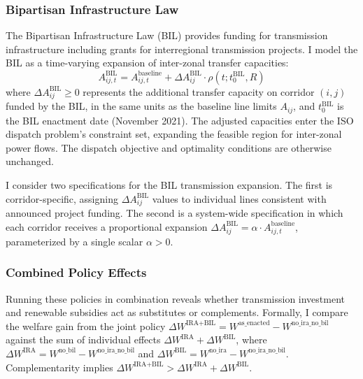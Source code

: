 \documentclass[12pt]{article}
\begin{document}

\subsubsection{Bipartisan Infrastructure Law}

The Bipartisan Infrastructure Law (BIL) provides funding for transmission infrastructure including grants for interregional transmission projects. I model the BIL as a time-varying expansion of inter-zonal transfer capacities:
\begin{equation}
    A_{ij,t}^{\text{BIL}} = A_{ij,t}^{\text{baseline}} + \Delta A^{\text{BIL}}_{ij} \cdot \rho(t; t_0^{\text{BIL}}, R)
\end{equation}
where $\Delta A^{\text{BIL}}_{ij} \geq 0$ represents the additional transfer capacity on corridor $(i,j)$ funded by the BIL, in the same units as the baseline line limits $A_{ij}$, and $t_0^{\text{BIL}}$ is the BIL enactment date (November 2021). The adjusted capacities enter the ISO dispatch problem's constraint set, expanding the feasible region for inter-zonal power flows. The dispatch objective and optimality conditions are otherwise unchanged.

I consider two specifications for the BIL transmission expansion. The first is corridor-specific, assigning $\Delta A^{\text{BIL}}_{ij}$ values to individual lines consistent with announced project funding. The second is a system-wide specification in which each corridor receives a proportional expansion $\Delta A^{\text{BIL}}_{ij} = \alpha \cdot A_{ij,t}^{\text{baseline}}$, parameterized by a single scalar $\alpha > 0$.


\subsubsection{Combined Policy Effects}

Running these policies in combination reveals whether transmission investment and renewable subsidies act as substitutes or complements. Formally, I compare the welfare gain from the joint policy $\Delta W^{\text{IRA+BIL}} = W^{\text{as\_enacted}} - W^{\text{no\_ira\_no\_bil}}$ against the sum of individual effects $\Delta W^{\text{IRA}} + \Delta W^{\text{BIL}}$, where $\Delta W^{\text{IRA}} = W^{\text{no\_bil}} - W^{\text{no\_ira\_no\_bil}}$ and $\Delta W^{\text{BIL}} = W^{\text{no\_ira}} - W^{\text{no\_ira\_no\_bil}}$. Complementarity implies $\Delta W^{\text{IRA+BIL}} > \Delta W^{\text{IRA}} + \Delta W^{\text{BIL}}$.
\end{document}
